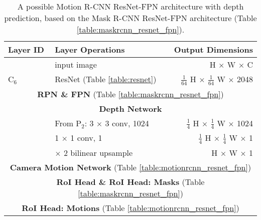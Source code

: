 {
\begin{table}[h]
\centering
\begin{tabular}{llr}
\toprule
\textbf{Layer ID} & \textbf{Layer Operations} & \textbf{Output Dimensions} \\
\midrule\midrule
& input image & H $\times$ W $\times$ C \\
\midrule
C$_6$ & ResNet (Table \ref{table:resnet}) & $\tfrac{1}{64}$ H $\times$ $\tfrac{1}{64}$ W $\times$ 2048 \\
\midrule
\multicolumn{3}{c}{\textbf{RPN \& FPN} (Table \ref{table:maskrcnn_resnet_fpn})} \\
\midrule
\multicolumn{3}{c}{\textbf{Depth Network}}\\
\midrule
& From P$_2$: 3 $\times$ 3 conv, 1024 & $\tfrac{1}{4}$ H $\times$ $\tfrac{1}{4}$ W $\times$ 1024 \\
& 1 $\times$ 1 conv, 1 & $\tfrac{1}{4}$ H $\times$ $\tfrac{1}{4}$ W $\times$ 1 \\
& $\times$ 2 bilinear upsample & H $\times$ W $\times$ 1 \\
\midrule
\multicolumn{3}{c}{\textbf{Camera Motion Network} (Table \ref{table:motionrcnn_resnet_fpn})}\\
\midrule
\multicolumn{3}{c}{\textbf{RoI Head \& RoI Head: Masks} (Table \ref{table:maskrcnn_resnet_fpn})} \\
\midrule
\multicolumn{3}{c}{\textbf{RoI Head: Motions} (Table \ref{table:motionrcnn_resnet_fpn})}\\
\bottomrule
\end{tabular}

\caption {
A possible Motion R-CNN ResNet-FPN architecture with depth prediction,
based on the Mask R-CNN ResNet-FPN architecture (Table \ref{table:maskrcnn_resnet_fpn}).
}
\label{table:motionrcnn_resnet_fpn_depth}
\end{table}
}
